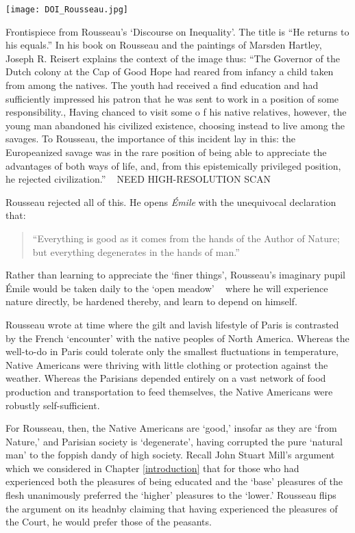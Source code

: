 \begin{marginfigure}\texttt{[image: DOI\_Rousseau.jpg]}\caption[Frontispiece from Rousseau's *Discourse on Inequality*]{Frontispiece from Rousseau's `Discourse on Inequality'. The title is ``He returns to his equals.'' In his book on Rousseau and the paintings of Marsden Hartley, Joseph R. Reisert explains the context of the image thus: ``The Governor of the Dutch colony at the Cap of Good Hope had reared from infancy a child taken from among the natives. The youth had received a find education and had sufficiently impressed his patron that he was sent to work in a position of some responsibility., Having chanced to visit some o f his native relatives, however, the young man abandoned his civilized existence, choosing instead to live among the savages. To Rousseau, the importance of this incident lay in this: the Europeanized savage was in the rare position of being able to appreciate the advantages of both ways of life, and, from this epistemically privileged position, he rejected civilization.'' ~\citep[P. 31]{Reisert:2003tw} NEED HIGH-RESOLUTION SCAN}\label{fig:rousseau}\end{marginfigure}Rousseau rejected all of this. He opens \emph{Émile} with the unequivocal declaration that:

\begin{quote}

``Everything is good as it comes from the hands of the Author of Nature; but everything degenerates in the hands of man.'' 
\end{quote}

Rather than learning to appreciate the `finer things', Rousseau's imaginary pupil Émile would be taken daily to the `open meadow' ~\citep[p. 43]{Rousseau:2007vp} where he will experience nature directly, be hardened thereby, and learn to depend on himself. 

Rousseau wrote at time where the gilt and lavish lifestyle of Paris is contrasted by the French `encounter' with the native peoples of North America. Whereas the well-to-do in Paris could tolerate only the smallest fluctuations in temperature, Native Americans were thriving with little clothing or protection against the weather. Whereas the Parisians depended entirely on a vast network of food production and transportation to feed themselves, the Native Americans were robustly self-sufficient. 

For Rousseau, then, the Native Americans are `good,' insofar as they are `from Nature,' and Parisian society is `degenerate', having corrupted the pure `natural man' to the foppish dandy of high society. Recall John Stuart Mill's argument which we considered in Chapter \ref{introduction} that for those who had experienced both the pleasures of being educated and the `base' pleasures of the flesh unanimously preferred the `higher' pleasures to the `lower.' Rousseau flips the argument on its headnby claiming that having experienced the pleasures of the Court, he would prefer those of the peasants.

